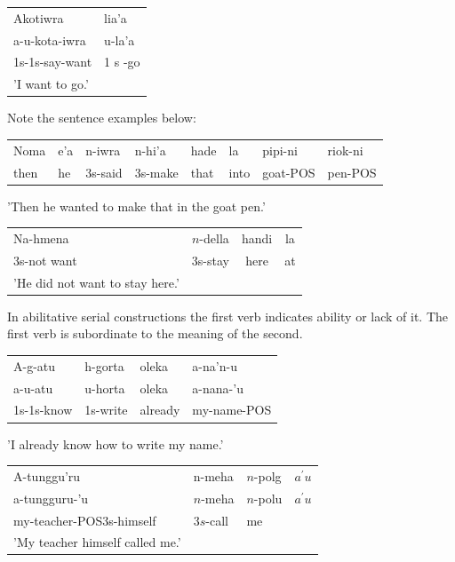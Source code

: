 \documentclass[10pt]{article}
\begin{document}
\begin{center}
\begin{tabular}{ll}
Akotiwra & lia'a \\
a-u-kota-iwra & u-la'a \\
1s-1s-say-want & 1 s -go \\
'I want to go.' &  \\
\end{tabular}
\end{center}

Note the sentence examples below:

\begin{center}
\begin{tabular}{llllllll}
Noma & e'a & n-iwra & n-hi'a & hade & la & pipi-ni & riok-ni \\
then & he & 3s-said & 3s-make & that & into & goat-POS & pen-POS \\
\end{tabular}
\end{center}

'Then he wanted to make that in the goat pen.'

\begin{center}
\begin{tabular}{lccc}
Na-hmena & \(n\)-della & handi & la \\
3s-not want & 3s-stay & here & at \\
'He did not want to stay here.' &  &  &  \\
\end{tabular}
\end{center}

In abilitative serial constructions the first verb indicates ability or lack of it. The first verb is subordinate to the meaning of the second.

\begin{center}
\begin{tabular}{llll}
A-g-atu & h-gorta & oleka & a-na'n-u \\
a-u-atu & u-horta & oleka & a-nana-'u \\
1s-1s-know & 1s-write & already & my-name-POS \\
\end{tabular}
\end{center}

'I already know how to write my name.'

\begin{center}
\begin{tabular}{llll}
A-tunggu'ru & n-meha & \(n\)-polg & \(a^{\prime} u\) \\
a-tungguru-'u & \(n\)-meha & \(n\)-polu & \(a^{\prime} u\) \\
my-teacher-POS3s-himself & \(3 s\)-call & me &  \\
'My teacher himself called me.' &  &  &  \\
\end{tabular}
\end{center}
\end{document}

